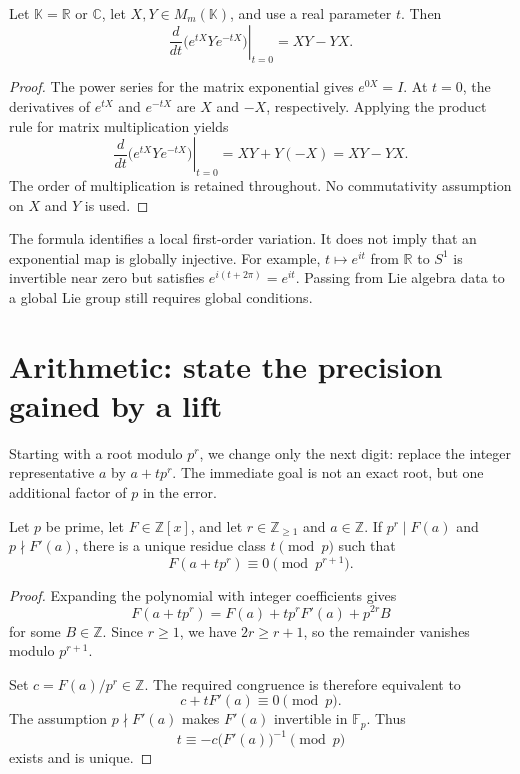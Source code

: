 \documentclass[11pt,a4paper]{article}
\begin{document}
\begin{proposition}\label{thm:conjugation-differential}

Let $\mathbb K=\mathbb R$ or $\mathbb C$, let $X,Y\in M_m(\mathbb K)$, and use a real parameter $t$. Then
\[
\left.\frac{d}{dt}\bigl(e^{tX}Ye^{-tX}\bigr)\right|_{t=0}
=XY-YX.
\]

\end{proposition}

\begin{proof}

The power series for the matrix exponential gives $e^{0X}=I$. At $t=0$, the derivatives of $e^{tX}$ and $e^{-tX}$ are $X$ and $-X$, respectively. Applying the product rule for matrix multiplication yields
\[
\left.\frac{d}{dt}\bigl(e^{tX}Ye^{-tX}\bigr)\right|_{t=0}
=XY+Y(-X)=XY-YX.
\]
The order of multiplication is retained throughout. No commutativity assumption on $X$ and $Y$ is used.
\end{proof}

The formula identifies a local first-order variation. It does not imply that an exponential map is globally injective. For example, $t\mapsto e^{it}$ from $\mathbb R$ to $S^1$ is invertible near zero but satisfies $e^{i(t+2\pi)}=e^{it}$. Passing from Lie algebra data to a global Lie group still requires global conditions.

\clearpage
\section{Arithmetic: state the precision gained by a lift}

Starting with a root modulo $p^r$, we change only the next digit: replace the integer representative $a$ by $a+t p^r$. The immediate goal is not an exact root, but one additional factor of $p$ in the error.

\begin{proposition}\label{thm:one-step-lifting}

Let $p$ be prime, let $F\in\mathbb Z[x]$, and let $r\in\mathbb Z_{\ge1}$ and $a\in\mathbb Z$. If $p^r\mid F(a)$ and $p\nmid F'(a)$, there is a unique residue class $t\pmod p$ such that
\[
F(a+t p^r)\equiv0\pmod{p^{r+1}}.
\]

\end{proposition}

\begin{proof}

Expanding the polynomial with integer coefficients gives
\[
F(a+t p^r)=F(a)+t p^rF'(a)+p^{2r}B
\]
for some $B\in\mathbb Z$. Since $r\ge1$, we have $2r\ge r+1$, so the remainder vanishes modulo $p^{r+1}$.

Set $c=F(a)/p^r\in\mathbb Z$. The required congruence is therefore equivalent to
\[
c+tF'(a)\equiv0\pmod p.
\]
The assumption $p\nmid F'(a)$ makes $F'(a)$ invertible in $\mathbb F_p$. Thus
\[
t\equiv-c\bigl(F'(a)\bigr)^{-1}\pmod p
\]
exists and is unique.
\end{proof}
\end{document}
